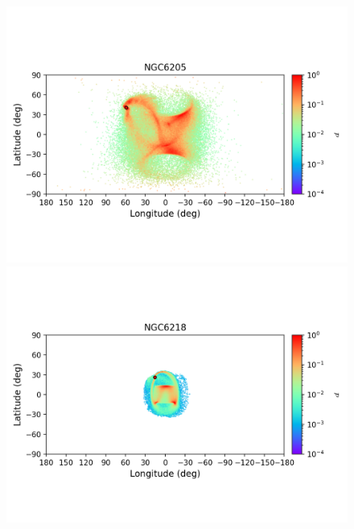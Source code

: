 \begin{figure}
\begin{center}
                \includegraphics[clip=true, trim = 0mm 20mm 0mm 10mm, width=1\columnwidth]{images/error_plots_NGC6205.png}
                \includegraphics[clip=true, trim = 0mm 20mm 0mm 10mm, width=1\columnwidth]{images/error_plots_NGC6218.png}
                

\end{center}
\end{figure}
